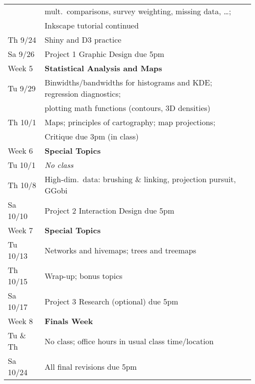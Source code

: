 \documentclass[12pt]{article}
\begin{document}
\begin{table}[h!]
\begin{tabular}{ll}
              & mult.\ comparisons, survey weighting, missing data, \ldots; \\
              & Inkscape tutorial continued \\
Th 9/24			  & Shiny and D3 practice \\
Sa 9/26       & Project 1 Graphic Design due 5pm \\ \hline
Week 5		& \textbf{Statistical Analysis and Maps} \\
Tu 9/29			  & Binwidths/bandwidths for histograms and KDE; regression diagnostics; \\
              & plotting math functions (contours, 3D densities) \\ 
Th 10/1			  & Maps; principles of cartography; map projections; \\
			        & Critique due 3pm (in class) \\ \hline
Week 6		& \textbf{Special Topics} \\
Tu 10/1				& \emph{No class} \\
Th 10/8       & High-dim.\ data: brushing \& linking, projection pursuit, GGobi \\ 
Sa 10/10      & Project 2 Interaction Design due 5pm \\ \hline
Week 7		& \textbf{Special Topics} \\ 
Tu 10/13			& Networks and hivemaps; trees and treemaps \\ 
Th 10/15			& Wrap-up; bonus topics \\ 
Sa 10/17      & Project 3 Research (optional) due 5pm \\ \hline
Week 8		& \textbf{Finals Week} \\
Tu \& Th			& No class; office hours in usual class time/location \\ 
Sa 10/24		  & All final revisions due 5pm
\end{tabular}
\end{table}
\end{document}
